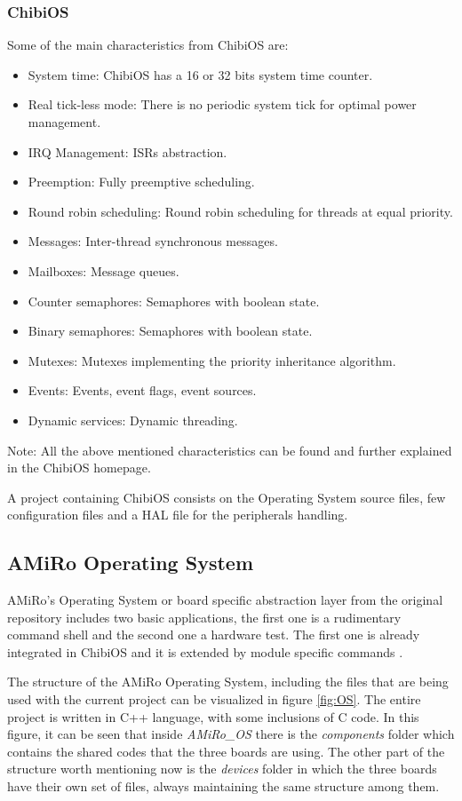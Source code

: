 \documentclass[12pt]{report}%
\begin{document}
\subsubsection{ChibiOS}
Some of the main characteristics from ChibiOS are:

\begin{itemize}
\item System time: ChibiOS has a 16 or 32 bits system time counter.
\item Real tick-less mode: There is no periodic system tick for optimal power management.
\item IRQ Management: ISRs abstraction.
\item Preemption: Fully preemptive scheduling.
\item Round robin scheduling: Round robin scheduling for threads at equal priority.
\item Messages: Inter-thread synchronous messages.
\item Mailboxes: Message queues.
\item Counter semaphores: Semaphores with boolean state.
\item Binary semaphores: Semaphores with boolean state.
\item Mutexes: Mutexes implementing the priority inheritance algorithm.
\item Events: Events, event flags, event sources.
\item Dynamic services: Dynamic threading.
\end{itemize}
Note: All the above mentioned characteristics can be found and further explained in the ChibiOS homepage. \cite{chibioshp}

A project containing ChibiOS consists on the Operating System source files, few configuration files and a HAL file for the peripherals handling.

\subsection{AMiRo Operating System}
\label{AMiRo_OS}
AMiRo's Operating System or board specific abstraction layer from the original repository \cite{AMiRo_Wiki} includes two basic applications, the first one is a rudimentary command shell and the second one a hardware test. The first one is already integrated in ChibiOS and it is extended by module specific commands \cite{AMiRo_paper_modular}.

The structure of the AMiRo Operating System, including the files that are being used with the current project can be visualized in figure \ref{fig:OS}. The entire project is written in C++ language, with some inclusions of C code. In this figure, it can be seen that inside \textit{AMiRo\_OS} there is the \textit{components} folder which contains the shared codes that the three boards are using. The other part of the structure worth mentioning now is the \textit{devices} folder in which the three boards have their own set of files, always maintaining the same structure among them.
\end{document}
